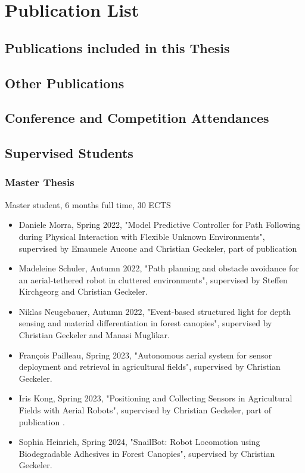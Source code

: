 \chapter{Publication List}
\label{ch:publication-list}

\section{Publications included in this Thesis}

\section{Other Publications}

\section{Conference and Competition Attendances}

\section{Supervised Students}

\subsection{Master Thesis}
Master student, 6 months full time, 30 ECTS


\begin{itemize}
    \item Daniele Morra, Spring 2022, "Model Predictive Controller for Path Following during Physical Interaction with Flexible Unknown Environments", supervised by Emaunele Aucone and Christian Geckeler, part of publication \cite{Aucone2023}

    \item  Madeleine Schuler, Autumn 2022, "Path planning and obstacle avoidance for an aerial-tethered robot in cluttered environments", supervised by Steffen Kirchgeorg and Christian Geckeler.

    \item Niklas Neugebauer, Autumn 2022, "Event-based structured light for depth sensing and material differentiation in forest canopies", supervised by Christian Geckeler and Manasi Muglikar.

    \item François Pailleau, Spring 2023, "Autonomous aerial system for sensor deployment and retrieval in agricultural fields", supervised by Christian Geckeler.

    \item Iris Kong, Spring 2023, "Positioning and Collecting Sensors in Agricultural Fields with Aerial Robots", supervised by Christian Geckeler, part of publication \cite{Geckeler2024User-CentricVehicles}.

    \item Sophia Heinrich, Spring 2024, "SnailBot: Robot Locomotion using Biodegradable Adhesives in Forest Canopies", supervised by Christian Geckeler. 
\end{itemize}


